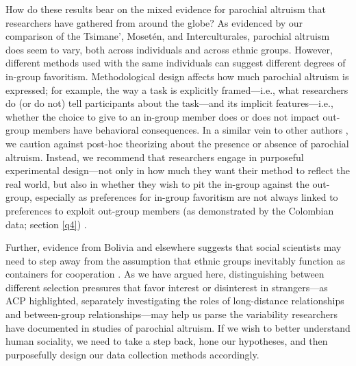 \documentclass[bibauthoryear]{aa}
\begin{document}
	How do these results bear on the mixed evidence for parochial altruism that researchers have gathered from around the globe? As evidenced by our comparison of the Tsimane', Moset\'en, and Interculturales, parochial altruism does seem to vary, both across individuals and across ethnic groups. However, different methods used with the same individuals can suggest different degrees of in-group favoritism. Methodological design affects how much parochial altruism is expressed; for example, the way a task is explicitly framed---i.e., what researchers do (or do not) tell participants about the task---and its implicit features---i.e., whether the choice to give to an in-group member does or does not impact out-group members \citep{hagen2006game, lightner2017, Pisor2020} have behavioral consequences. In a similar vein to other authors \citep[e.g.,][]{hagen2006game, guala2012reciprocity}, we caution against post-hoc theorizing about the presence or absence of parochial altruism. Instead, we recommend that researchers engage in purposeful experimental design---not only in how much they want their method to reflect the real world, but also in whether they wish to pit the in-group against the out-group, especially as preferences for in-group favoritism are not always linked to preferences to exploit out-group members (as demonstrated by the Colombian data; section \ref{q4}) \citep{brewer2006evolutionary, cashdan2001ethnocentrism, hruschka2013economic, purzycki2019identity, schaub2017threat, yamagishi2013behavioral}. %
	
	Further, evidence from Bolivia and elsewhere suggests that social scientists may need to step away from the assumption that ethnic groups inevitably function as containers for cooperation \citep{moya2015different}. As we have argued here, distinguishing between different selection pressures that favor interest or disinterest in strangers---as ACP highlighted, separately investigating the roles of long-distance relationships and  between-group relationships---may help us parse the variability researchers have documented in studies of parochial altruism. If we wish to better understand human sociality, we need to take a step back, hone our hypotheses, and then purposefully design our data collection methods accordingly.
\end{document}
